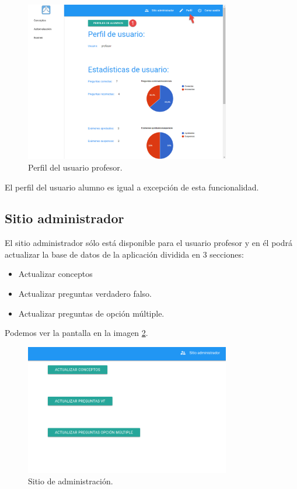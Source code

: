 \begin{figure}[!H]
 	\centering
 	\includegraphics[width=0.8\textwidth]{../images/manual/perfil_profesor.png}
    \caption{Perfil del usuario profesor.}
    \label{fig:man_perfil_profesor}
\end{figure}

\bigskip
El perfil del usuario alumno es igual a excepción de esta funcionalidad.


\subsection{Sitio administrador}

\bigskip
El sitio administrador sólo está disponible para el usuario profesor y en él podrá actualizar la base de datos de la aplicación dividida en 3 secciones: 

\begin{itemize}
    \item Actualizar conceptos
    \item Actualizar preguntas verdadero falso.
    \item Actualizar preguntas de opción múltiple.
 \end{itemize}

 Podemos ver la pantalla en la imagen \ref{fig:man_administrador}.


\begin{figure}[!H]
 	\centering
 	\includegraphics[width=0.8\textwidth]{../images/manual/administrador.png}
    \caption{Sitio de administración.}
    \label{fig:man_administrador}
\end{figure}